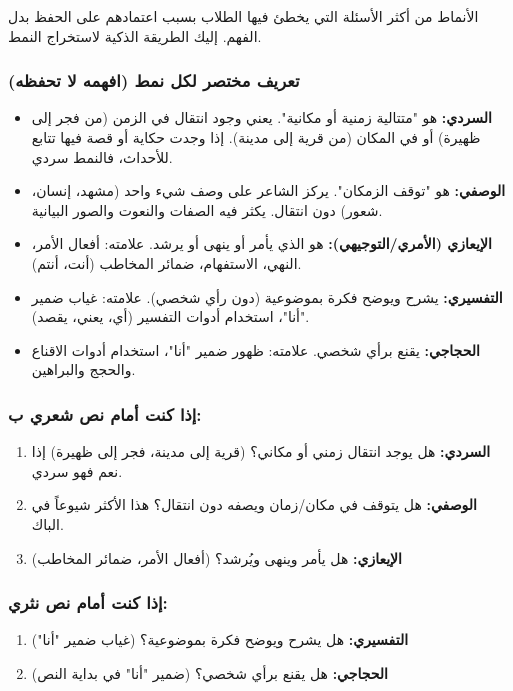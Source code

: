 \documentclass[12pt,a4paper]{book}
\begin{document}
	الأنماط من أكثر الأسئلة التي يخطئ فيها الطلاب بسبب اعتمادهم على الحفظ بدل الفهم. إليك الطريقة الذكية لاستخراج النمط.
	
	\subsubsection*{تعريف مختصر لكل نمط (افهمه لا تحفظه)}
	\begin{itemize}
		\item \textbf{السردي:} هو "متتالية زمنية أو مكانية". يعني وجود انتقال في الزمن (من فجر إلى ظهيرة) أو في المكان (من قرية إلى مدينة). إذا وجدت حكاية أو قصة فيها تتابع للأحداث، فالنمط سردي.
		\item \textbf{الوصفي:} هو "توقف الزمكان". يركز الشاعر على وصف شيء واحد (مشهد، إنسان، شعور) دون انتقال. يكثر فيه الصفات والنعوت والصور البيانية.
		\item \textbf{الإيعازي (الأمري/التوجيهي):} هو الذي يأمر أو ينهى أو يرشد. علامته: أفعال الأمر، النهي، الاستفهام، ضمائر المخاطب (أنت، أنتم).
		\item \textbf{التفسيري:} يشرح ويوضح فكرة بموضوعية (دون رأي شخصي). علامته: غياب ضمير "أنا"، استخدام أدوات التفسير (أي، يعني، يقصد).
		\item \textbf{الحجاجي:} يقنع برأي شخصي. علامته: ظهور ضمير "أنا"، استخدام أدوات الاقناع والحجج والبراهين.
	\end{itemize}
	
	\subsubsection*{إذا كنت أمام نص شعري ب:}
	\begin{enumerate}
		\item \textbf{السردي:} هل يوجد انتقال زمني أو مكاني؟ (قرية إلى مدينة، فجر إلى ظهيرة) إذا نعم فهو سردي.
		\item \textbf{الوصفي:} هل يتوقف في مكان/زمان ويصفه دون انتقال؟ هذا الأكثر شيوعاً في الباك.
		\item \textbf{الإيعازي:} هل يأمر وينهى ويُرشد؟ (أفعال الأمر، ضمائر المخاطب)
	\end{enumerate}
	
	\subsubsection*{إذا كنت أمام نص نثري:}
	\begin{enumerate}
		\item \textbf{التفسيري:} هل يشرح ويوضح فكرة بموضوعية؟ (غياب ضمير "أنا")
		\item \textbf{الحجاجي:} هل يقنع برأي شخصي؟ (ضمير "أنا" في بداية النص)
	\end{enumerate}
	
\end{document}

